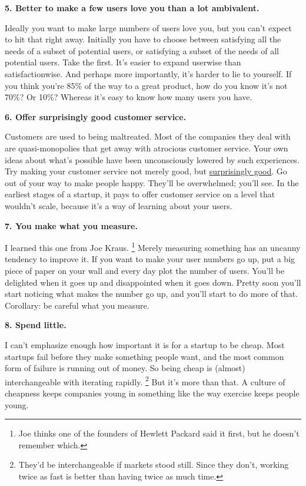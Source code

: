 \textbf{5. Better to make a few users love you than a lot ambivalent.}

Ideally you want to make large numbers of users love you, but you can't
expect to hit that right away. Initially you have to choose between
satisfying all the needs of a subset of potential users, or satisfying a
subset of the needs of all potential users. Take the first. It's easier
to expand userwise than satisfactionwise. And perhaps more importantly,
it's harder to lie to yourself. If you think you're 85\% of the way to a
great product, how do you know it's not 70\%? Or 10\%? Whereas it's easy
to know how many users you have.

\textbf{6. Offer surprisingly good customer service.}

Customers are used to being maltreated. Most of the companies they deal
with are quasi-monopolies that get away with atrocious customer service.
Your own ideas about what's possible have been unconsciously lowered by
such experiences. Try making your customer service not merely good, but
\href{http://www.diaryofawebsite.com/blog/2008/07/wufoo-and-the-art-of-customer-service/}{surprisingly
good}. Go out of your way to make people happy. They'll be overwhelmed;
you'll see. In the earliest stages of a startup, it pays to offer
customer service on a level that wouldn't scale, because it's a way of
learning about your users.

\textbf{7. You make what you measure.}

I learned this one from Joe Kraus. \footnote{Joe thinks one of the founders of Hewlett Packard said it first,
but he doesn't remember which.} Merely
measuring something has an uncanny tendency to improve it. If you want
to make your user numbers go up, put a big piece of paper on your wall
and every day plot the number of users. You'll be delighted when it goes
up and disappointed when it goes down. Pretty soon you'll start noticing
what makes the number go up, and you'll start to do more of that.
Corollary: be careful what you measure.

\textbf{8. Spend little.}

I can't emphasize enough how important it is for a startup to be cheap.
Most startups fail before they make something people want, and the most
common form of failure is running out of money. So being cheap is
(almost) interchangeable with iterating rapidly. \footnote{They'd be interchangeable if markets stood still. Since they
don't, working twice as fast is better than having twice as much time.}
But it's more than that. A culture of cheapness keeps companies young in
something like the way exercise keeps people young.

